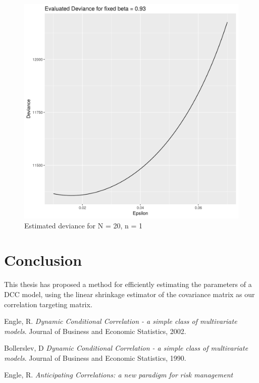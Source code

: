 \documentclass{article} %
\numberwithin{equation}{section} %
\numberwithin{figure}{section} %
\numberwithin{table}{section} %
\begin{document}
\begin{figure}[h]
\begin{center}
\includegraphics[scale = 0.5]{loglik3.png}
\caption{Estimated deviance for N = 20, n = 1}
\end{center}
\end{figure}


\section{Conclusion}

This thesis has proposed a method for efficiently estimating the parameters of a DCC model, using the linear shrinkage estimator of the covariance matrix as our correlation targeting matrix.

\pagebreak

\begin{thebibliography}{9}
Engle, R.
\textit{Dynamic Conditional Correlation - a simple class of multivariate models}.
Journal of Business and Economic Statistics, 2002.

Bollerslev, D
\textit{Dynamic Conditional Correlation - a simple class of multivariate models}.
Journal of Business and Economic Statistics, 1990.

Engle, R.
\textit{Anticipating Correlations: a new paradigm for risk management}
\end{thebibliography}
\end{document}

